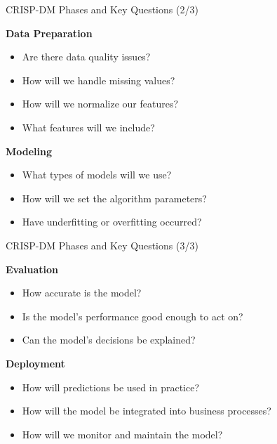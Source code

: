 \documentclass[aspectratio=169,xcolor=dvipsnames]{beamer}
\begin{document}
\begin{frame}{CRISP-DM Phases and Key Questions (2/3)}

\begin{block}{\textbf{Data Preparation}}
\begin{itemize}
  \item Are there data quality issues?
  \item How will we handle missing values?
  \item How will we normalize our features?
  \item What features will we include?
\end{itemize}
\end{block}

\vspace{0.5em}

\begin{block}{\textbf{Modeling}}
\begin{itemize}
  \item What types of models will we use?
  \item How will we set the algorithm parameters?
  \item Have underfitting or overfitting occurred?
\end{itemize}
\end{block}

\end{frame}

\begin{frame}{CRISP-DM Phases and Key Questions (3/3)}

\begin{block}{\textbf{Evaluation}}
\begin{itemize}
  \item How accurate is the model?
  \item Is the model's performance good enough to act on?
  \item Can the model's decisions be explained?
\end{itemize}
\end{block}

\vspace{0.5em}

\begin{block}{\textbf{Deployment}}
\begin{itemize}
  \item How will predictions be used in practice?
  \item How will the model be integrated into business processes?
  \item How will we monitor and maintain the model?
\end{itemize}
\end{block}

\end{frame}
\end{document}

